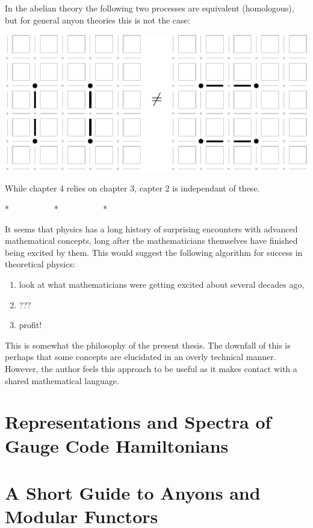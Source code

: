 \documentclass[11pt,twoside,openright]{report}
\begin{document}
In the abelian theory the following two
processes are equivalent (homologous), but for
general anyon theories this is not the case:
\begin{center}
\includegraphics[width=0.5\columnwidth]{pic-toric-nonab.pdf}
\end{center}

While chapter 4 relies on chapter 3, capter 2 is independant of these.

\begin{center}
* \ \ \ \ \ \ \ \ \ \ * \ \ \ \ \ \ \ \ \ \ *
\end{center}

\begin{samepage}
It seems that physics has a long history of surprising encounters
with advanced mathematical concepts,
long after the mathematicians
themselves have finished being excited by them.
This would suggest the following algorithm for
success in theoretical physics:
\begin{enumerate}
\item look at what mathematicians were getting excited about several decades ago,
\item ???
\item profit!
\end{enumerate}
\end{samepage}
This is somewhat the philosophy of the present thesis.
The downfall of this is perhaps that some concepts are
elucidated in an overly technical manner. However, the
author feels this approach to be useful as it makes contact
with a shared mathematical language.

\chapter{Representations and Spectra of Gauge Code Hamiltonians}




\chapter{A Short Guide to Anyons and Modular Functors}








{}

\end{document}
